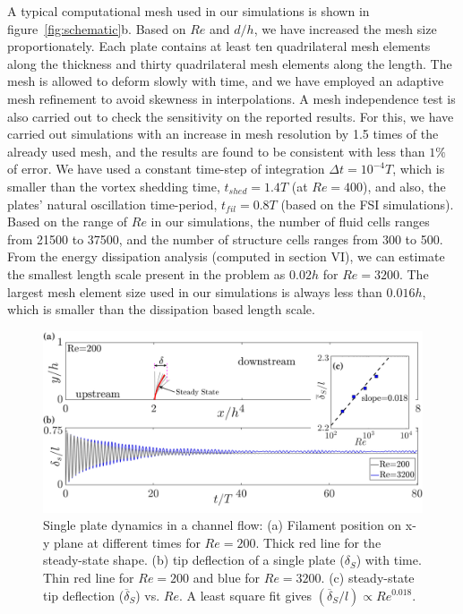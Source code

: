 \documentclass[aps,pre,twocolumn,aps,longbibliography]{revtex4-1}
\begin{document}
	A typical computational mesh used in our simulations is shown in figure~\ref{fig:schematic}b. Based on $Re$ and $d/h$, we have increased the mesh size proportionately. Each plate contains at least ten quadrilateral mesh elements along the thickness and thirty quadrilateral mesh elements along the length. The mesh is allowed to deform slowly with time, and we have employed an adaptive mesh refinement to avoid skewness in interpolations. A mesh independence test is also carried out to check the sensitivity on the reported results. For this, we have carried out simulations with an increase in mesh resolution by 1.5 times of the already used mesh, and the results are found to be consistent with less than $1\%$ of error. We have used a constant time-step of integration $\Delta t = 10^{-4}T$, which is smaller than the vortex shedding time, $t_{shed}=1.4T$ (at $Re=400$), and also, the plates' natural oscillation time-period, $t_{fil}=0.8T$ (based on the FSI simulations). Based on the range of $Re$ in our simulations, the number of fluid cells ranges from 21500 to 37500, and the number of structure cells ranges from 300 to 500. From the energy dissipation analysis (computed in section VI), we can estimate the smallest length scale present in the problem as $0.02h$ for $Re=3200$. The largest mesh element size used in our simulations is always less than $0.016h$, which is smaller than the dissipation based length scale.
	
		\begin{figure}
			\begin{minipage}[c]{1\linewidth}
				\includegraphics[width=1\linewidth]{Fig03.pdf} 
			\end{minipage} 
			\caption{Single plate dynamics in a channel flow: (a) Filament position on x-y plane at different times for $Re=200$. Thick red line for the steady-state shape. (b) tip deflection of a single plate ($\delta_S$) with time. Thin red line for $Re=200$ and blue for $Re=3200$. (c) steady-state tip deflection ($\overline{\delta}_S$) vs. $Re$. A least square fit gives $(\overline{\delta}_S/l)\propto Re^{0.018}$.}
			\label{fig:Sfil_dyn}
		\end{figure} 
	
\end{document}

